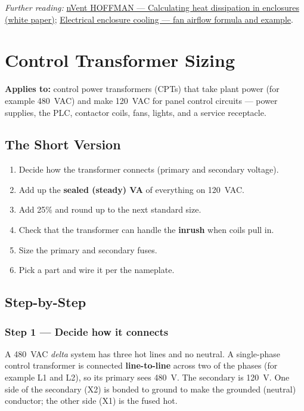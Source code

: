 \textit{Further reading:} \href{https://www.nvent.com/sites/default/files/acquiadam/assets/Heat\%20dissipation_En_nVent_HOFFMAN_2.pdf}{nVent HOFFMAN --- Calculating heat dissipation in enclosures (white paper)}; \href{https://www.proventofan.com/how-to-calculate-electrical-enclosure-cooling-formula-example-and-fan-sizing/}{Electrical enclosure cooling --- fan airflow formula and example}.

\section{Control Transformer Sizing}
\label{app:transformer-sizing}
\textbf{Applies to:} control power transformers (CPTs) that take plant power (for example 480~VAC) and make 120~VAC for panel control circuits --- power supplies, the PLC, contactor coils, fans, lights, and a service receptacle.

\subsection{The Short Version}
\begin{enumerate}[itemsep=2pt]
  \item Decide how the transformer connects (primary and secondary voltage).
  \item Add up the \textbf{sealed (steady) VA} of everything on 120~VAC.
  \item Add 25\% and round up to the next standard size.
  \item Check that the transformer can handle the \textbf{inrush} when coils pull in.
  \item Size the primary and secondary fuses.
  \item Pick a part and wire it per the nameplate.
\end{enumerate}

\subsection{Step-by-Step}
\subsubsection*{Step 1 --- Decide how it connects}
A 480~VAC \emph{delta} system has three hot lines and no neutral. A single-phase control transformer is connected \textbf{line-to-line} across two of the phases (for example L1 and L2), so its primary sees 480~V. The secondary is 120~V. One side of the secondary (X2) is bonded to ground to make the grounded (neutral) conductor; the other side (X1) is the fused hot.

